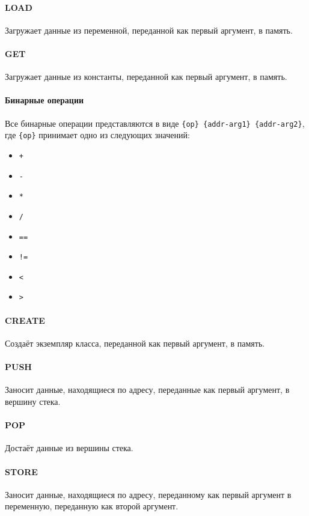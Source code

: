 \documentclass[a4paper,12pt,notitlepage,pdftex]{scrreprt}
\begin{document}
    \paragraph{LOAD} Загружает данные из переменной, переданной как первый аргумент, в память.
    \paragraph{GET} Загружает данные из константы, переданной как первый аргумент, в память.
    \paragraph{Бинарные операции}
        Все бинарные операции представляются в виде \verb"{op} {addr-arg1} {addr-arg2}", где \verb"{op}" принимает
        одно из следующих значений:
    \begin{multicols}{4}
        \begin{itemize}
            \item \verb"+"
            \item \verb"-"
            \item \verb"*"
            \item \verb"/"
            \item \verb"=="
            \item \verb"!="
            \item \verb"<"
            \item \verb">"
        \end{itemize}
    \end{multicols}
    \paragraph{CREATE} Создаёт экземпляр класса, переданной как первый аргумент, в память.
    \paragraph{PUSH} Заносит данные, находящиеся по адресу, переданные как первый аргумент, в вершину стека.
    \paragraph{POP} Достаёт данные из вершины стека.
    \paragraph{STORE} Заносит данные, находящиеся по адресу, переданному как первый аргумент в переменную,
    переданную как второй аргумент.
\end{document}
